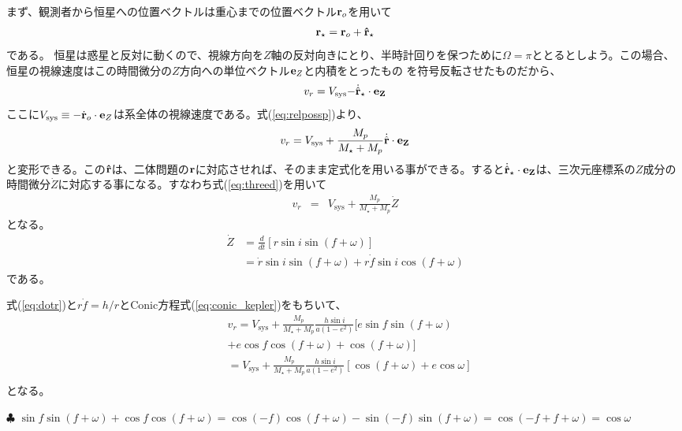 まず、観測者から恒星への位置ベクトルは重心までの位置ベクトル${\bf r}_o$を用いて
\begin{eqnarray}
{\bf r}_\star = {\bf r}_o + {\bf \hat{r}}_\star 
\end{eqnarray}
である。{ 恒星は惑星と反対に動くので、視線方向を$Z$軸の反対向きにとり、半時計回りを保つために$\Omega=\pi$ととるとしよう。この場合、} 恒星の視線速度はこの時間微分の$Z$方向への単位ベクトル${\bf e}_Z$と内積をとったもの{ を符号反転させたもの}だから、
\begin{eqnarray}
\label{eq:vrsatare}
v_r = V_\mathrm{sys} { -} \dot{\hat{\bf r}}_\star \cdot {\bf e}_Z
\end{eqnarray}
ここに$V_\mathrm{sys} \equiv { - } \dot{{\bf r}}_o \cdot {\bf e}_Z $は系全体の視線速度である。式(\ref{eq:relpossp})より、
\begin{eqnarray}
\label{eq:vrsatare2}
v_r = V_\mathrm{sys} + \frac{M_p}{M_\star + M_p} \dot{\hat{\bf r}} \cdot {\bf e}_Z
\end{eqnarray}
と変形できる。この${\bf \hat{r}}$は、二体問題の${\bf r}$に対応させれば、そのまま定式化を用いる事ができる。すると$\dot{\hat{\bf r}}_\star \cdot {\bf e}_Z$は、三次元座標系の$Z$成分の時間微分$\dot{Z}$に対応する事になる。すなわち式(\ref{eq:threed})を用いて
\begin{eqnarray}
\label{eq:vrsatare3}
v_r &=& V_\mathrm{sys} + \frac{M_p}{M_\star + M_p} \dot{Z} 
\end{eqnarray}
となる。
\begin{align}
\dot{Z} &= \frac{d}{d t} \left[ r \sin{i} \sin{(f + \omega)} \right] \nonumber \\
&= \dot{r} \sin{i} \sin{(f + \omega)} + r \dot{f} \sin{i} \cos{(f + \omega)}
\end{align}
である。

式(\ref{eq:dotr})と$r \dot{f} = h/r$とConic方程式(\ref{eq:conic_kepler})をもちいて、
\begin{align}
\label{eq:vrsatare4}
&v_r =V_\mathrm{sys} + \frac{M_p}{M_\star + M_p} \frac{h \sin{i}}{a (1-e^2)} [ e \sin{f} \sin{(f+\omega)}   \nonumber \\
&+ e \cos{f} \cos{(f+\omega)} + \cos{(f+\omega)} ] \\
&=V_\mathrm{sys} + \frac{M_p}{M_\star + M_p} \frac{h \sin{i}}{a (1-e^2)} \left[ \cos{(f+\omega)} + e \cos{\omega} \right] \nonumber \\
\end{align}
となる。
\begin{itembox}{$\clubsuit$}
\footnotesize
\color{gray}
$\sin{f} \sin{(f+\omega)} + \cos{f} \cos{(f+\omega)} = \cos{(-f)} \cos{(f+\omega)} - \sin{(-f)} \sin{(f+\omega)} = \cos{(-f + f + \omega)} = \cos{\omega}$
\end{itembox}

